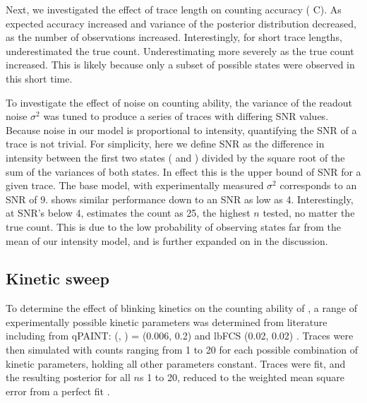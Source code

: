 Next, we investigated the effect of trace length on counting accuracy ( C).
	As expected accuracy increased and variance of the posterior distribution decreased, 
	as the number of observations increased.
	Interestingly, for short trace lengths, \ours underestimated the true count. 
	Underestimating more severely as the true count increased.
	This is likely because only a subset of possible states were observed in this short time.

To investigate the effect of noise on counting ability, the variance of the readout noise $\sigma^{2}$ was tuned to produce a 
	series of traces with differing SNR values. 
	Because noise in our model is proportional to intensity, quantifying the SNR of a trace 
	is not trivial. 
	For simplicity, here we define SNR as the difference in intensity between 
	the first two states ( and ) divided by the square root of the sum of the variances of both states. 
	In effect this is the upper bound of SNR for a given trace. 
	The base model, with experimentally measured $\sigma^{2}$ corresponds to an SNR of 9. 
	\ours shows similar performance down to an SNR as low as 4. 
	Interestingly, at SNR's below 4, \ours estimates the count as 25, the highest $n$ tested, no matter the true count. 
	This is due to the low probability of observing states far from the mean of our intensity model, and is further expanded on in the discussion. 


\subsection{Kinetic sweep}
To determine the effect of blinking kinetics on the counting ability of \ours, 
	a range of experimentally possible kinetic parameters was determined from literature including from 
	qPAINT: (\pon, \poff) = (0.006, 0.2) \cite{jungmann_2016} and lbFCS (0.02, 0.02) \cite{stein_2021}. 
	Traces were then simulated with counts ranging from 1 to 20 
	for each possible combination of kinetic parameters, holding all other parameters constant. 
	Traces were fit, and the resulting posterior for all $n$s 1 to 20, 
	reduced to the weighted mean square error from a perfect fit .
	

